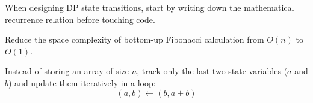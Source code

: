 \documentclass[mode=notes, palette=ocean, fontsize=11pt]{modernclassnotes}
\begin{document}
\begin{tip}
When designing DP state transitions, start by writing down the mathematical recurrence relation before touching code.
\end{tip}

\begin{exercise}
Reduce the space complexity of bottom-up Fibonacci calculation from $O(n)$ to $O(1)$.
\end{exercise}

\begin{solution}
Instead of storing an array of size $n$, track only the last two state variables ($a$ and $b$) and update them iteratively in a loop:
\[
(a, b) \leftarrow (b, a + b)
\]
\end{solution}
\end{document}
